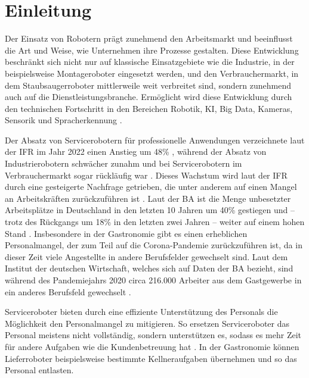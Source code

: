 \section{Einleitung}
Der Einsatz von Robotern prägt zunehmend den Arbeitsmarkt und beeinflusst die Art und Weise, wie Unternehmen ihre Prozesse gestalten. Diese Entwicklung beschränkt sich nicht nur auf klassische Einsatzgebiete wie die Industrie, in der beispielsweise Montageroboter eingesetzt werden, und den Verbrauchermarkt, in dem Staubsaugerroboter mittlerweile weit verbreitet sind, sondern zunehmend auch auf die Dienstleistungsbranche. Ermöglicht wird diese Entwicklung durch den technischen Fortschritt in den Bereichen Robotik, \ac{KI}, Big Data, Kameras, Sensorik und Spracherkennung \cite[S.~424]{Paluch2020}.

Der Absatz von Servicerobotern für professionelle Anwendungen verzeichnete laut der \ac{IFR} im Jahr 2022 einen Anstieg um 48\% \cite{IFR2023}, während der Absatz von Industrierobotern schwächer zunahm \cite[S.~9]{WorldRobotics2023} und bei Servicerobotern im Verbrauchermarkt sogar rückläufig war \cite[S.~37]{WorldRobotics2023}. Dieses Wachstum wird laut der \ac{IFR} durch eine gesteigerte Nachfrage getrieben, die unter anderem auf einen Mangel an Arbeitskräften zurückzuführen ist \cite[S.~33-34]{WorldRobotics2023}. Laut der \ac{BA} ist die Menge unbesetzter Arbeitsplätze in Deutschland in den letzten 10 Jahren um 40\% gestiegen und – trotz des Rückgangs um 18\% in den letzten zwei Jahren – weiter auf einem hohen Stand \cite{BA2024}. Insbesondere in der Gastronomie gibt es einen erheblichen Personalmangel, der zum Teil auf die Corona-Pandemie zurückzuführen ist, da in dieser Zeit viele Angestellte in andere Berufsfelder gewechselt sind. Laut dem Institut der deutschen Wirtschaft, welches sich auf Daten der \ac{BA} bezieht, sind während des Pandemiejahrs 2020 circa 216.000 Arbeiter aus dem Gastgewerbe in ein anderes Berufsfeld gewechselt \cite[S.~1]{Jansen2022}.

Serviceroboter bieten durch eine effiziente Unterstützung des Personals die Möglichkeit den Personalmangel zu mitigieren. So ersetzen Serviceroboter das Personal meistens nicht vollständig, sondern unterstützen es, sodass es mehr Zeit für andere Aufgaben wie die Kundenbetreuung hat \cite[S.~271-272]{Sprenger2015}. In der Gastronomie können Lieferroboter beispielsweise bestimmte Kellneraufgaben übernehmen und so das Personal entlasten.

